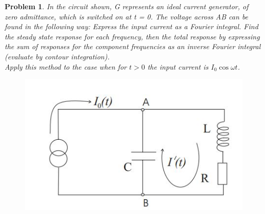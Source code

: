 \documentclass[a4paper]{article}
\theoremstyle{new}
\newtheorem{qns}{Problem}[section]
\begin{document}
\begin{qns}
In the circuit shown, G represents an ideal current generator, of zero admittance, which is switched on at t = 0. The voltage across AB can be found in the following way: Express the input current as a Fourier integral. Find the steady state response for each frequency, then the total response by expressing the sum of responses for the component frequencies as an inverse Fourier integral (evaluate by contour integration).\\[5pt]
Apply this method to the case when for $t > 0$ the input current is $I_0\cos \omega t$.
\begin{figure}[H]
    \centering
    \includegraphics[scale=0.5]{TP1_Q2_G.JPG}
\end{figure}
\end{qns}
\end{document}
